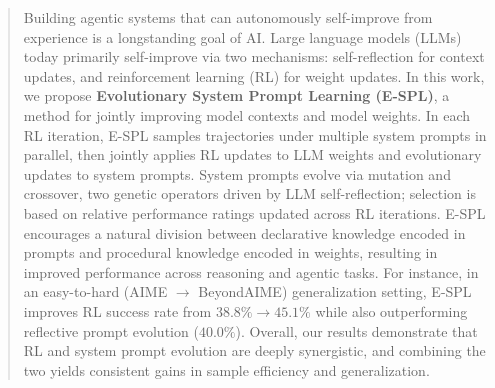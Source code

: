 \documentclass{article}
\theoremstyle{plain}
\theoremstyle{definition}
\theoremstyle{remark}
\begin{document}

\printAffiliationsAndNotice{}

\begin{abstract}
Building agentic systems that can autonomously self-improve from experience is a longstanding goal of AI. Large language models (LLMs) today primarily self-improve via two mechanisms: self-reflection for context updates, and reinforcement learning (RL) for weight updates. In this work, we propose \textbf{Evolutionary System Prompt Learning (E-SPL)}, a method for jointly improving model contexts and model weights.
In each RL iteration, E-SPL samples trajectories under multiple system prompts in parallel, then jointly applies RL updates to LLM weights and evolutionary updates to system prompts. System prompts evolve via mutation and crossover, two genetic operators driven by LLM self-reflection; selection is based on relative performance ratings updated across RL iterations. E-SPL encourages a natural division between declarative knowledge encoded in prompts and procedural knowledge encoded in weights, resulting in improved performance across reasoning and agentic tasks. For instance, in an easy-to-hard (AIME $\rightarrow$ BeyondAIME) generalization setting, E-SPL improves RL success rate from $38.8\% \rightarrow 45.1\%$ while also outperforming reflective prompt evolution ($40.0\%$).
Overall, our results demonstrate that RL and system prompt evolution are deeply synergistic, and combining the two yields consistent gains in sample efficiency and generalization.
\end{abstract}
\end{document}
